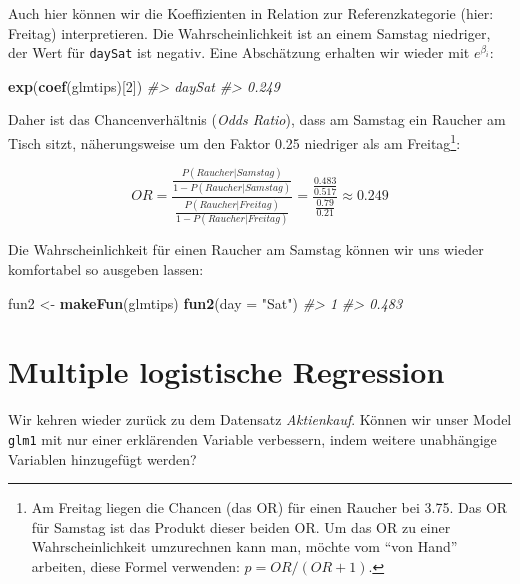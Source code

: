 \documentclass[12pt,ngerman,]{book}
\newenvironment{Shaded}{\begin{snugshade}}{\end{snugshade}}
\newcommand{\KeywordTok}[1]{\textcolor[rgb]{0.13,0.29,0.53}{\textbf{{#1}}}}
\newcommand{\DataTypeTok}[1]{\textcolor[rgb]{0.13,0.29,0.53}{{#1}}}
\newcommand{\DecValTok}[1]{\textcolor[rgb]{0.00,0.00,0.81}{{#1}}}
\newcommand{\StringTok}[1]{\textcolor[rgb]{0.31,0.60,0.02}{{#1}}}
\newcommand{\CommentTok}[1]{\textcolor[rgb]{0.56,0.35,0.01}{\textit{{#1}}}}
\newcommand{\NormalTok}[1]{{#1}}
\let\rmarkdownfootnote\footnote%
\def\footnote{\protect\rmarkdownfootnote}
\renewenvironment{Shaded}{\begin{kframe}}{\end{kframe}}
\begin{document}
Auch hier können wir die Koeffizienten in Relation zur Referenzkategorie
(hier: Freitag) interpretieren. Die Wahrscheinlichkeit ist an einem
Samstag niedriger, der Wert für \texttt{daySat} ist negativ. Eine
Abschätzung erhalten wir wieder mit \(e^{\beta_i}\):

\begin{Shaded}
\begin{Highlighting}[]
\KeywordTok{exp}\NormalTok{(}\KeywordTok{coef}\NormalTok{(glmtips)[}\DecValTok{2}\NormalTok{])}
\CommentTok{#> daySat }
\CommentTok{#>  0.249}
\end{Highlighting}
\end{Shaded}

Daher ist das Chancenverhältnis (\emph{Odds Ratio}), dass am Samstag ein
Raucher am Tisch sitzt, näherungsweise um den Faktor 0.25 niedriger als
am Freitag\footnote{Am Freitag liegen die Chancen (das OR) für einen
  Raucher bei 3.75. Das OR für Samstag ist das Produkt dieser beiden OR.
  Um das OR zu einer Wahrscheinlichkeit umzurechnen kann man, möchte vom
  ``von Hand'' arbeiten, diese Formel verwenden: \(p = OR / (OR + 1)\).}:

\[{OR=\frac{\frac{P(Raucher|Samstag)}{1-P(Raucher|Samstag)}}
{\frac{P(Raucher|Freitag)}{1-P(Raucher|Freitag)}}
=\frac{\frac{0.483}{0.517}}
{\frac{0.79}{0.21}}
\approx 0.249}\]

Die Wahrscheinlichkeit für einen Raucher am Samstag können wir uns
wieder komfortabel so ausgeben lassen:

\begin{Shaded}
\begin{Highlighting}[]
\NormalTok{fun2 <-}\StringTok{ }\KeywordTok{makeFun}\NormalTok{(glmtips)}
\KeywordTok{fun2}\NormalTok{(}\DataTypeTok{day =} \StringTok{"Sat"}\NormalTok{)}
\CommentTok{#>     1 }
\CommentTok{#> 0.483}
\end{Highlighting}
\end{Shaded}

\section{Multiple logistische
Regression}\label{multiple-logistische-regression}

Wir kehren wieder zurück zu dem Datensatz \emph{Aktienkauf}. Können wir
unser Model \texttt{glm1} mit nur einer erklärenden Variable verbessern,
indem weitere unabhängige Variablen hinzugefügt werden?
\end{document}
